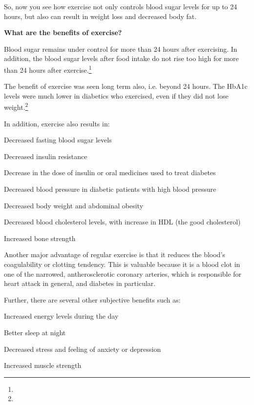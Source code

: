 So, now you see how exercise not only controls blood sugar levels for up to 24 hours, but also can result in weight loss and decreased body fat.

\textbf{What are the benefits of exercise?}

Blood sugar remains under control for more than 24 hours after exercising. In addition, the blood sugar levels after food intake do not rise too high for more than 24 hours after exercise.\footnote{}

The benefit of exercise was seen long term also, i.e. beyond 24 hours. The HbA1c levels were much lower in diabetics who exercised, even if they did not lose weight.\footnote{}

In addition, exercise also results in:

\item Decreased fasting blood sugar levels

 \item Decreased insulin resistance

 \item Decrease in the dose of insulin or oral medicines used to treat diabetes

 \item Decreased blood pressure in diabetic patients with high blood pressure

 \item Decreased body weight and abdominal obesity

 \item Decreased blood cholesterol levels, with increase in HDL (the good cholesterol)

 \item Increased bone strength

Another major advantage of regular exercise is that it reduces the blood’s coagulability or clotting tendency. This is valuable because it is a blood clot in one of the narrowed, antherosclerotic coronary arteries, which is responsible for heart attack in general, and diabetes in particular.

Further, there are several other subjective benefits such as:

\item Increased energy levels during the day

 \item Better sleep at night

 \item Decreased stress and feeling of anxiety or depression

 \item Increased muscle strength

